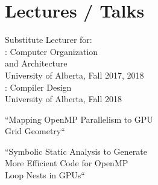 \documentclass[]{twocol-resume}
\begin{document}
\begin{minipage}[t]{0.33\textwidth}
\section{Lectures / Talks}
\vspace{\topsep} %
\begin{tightemize}
\item Substitute Lecturer for:
  \\\hspace{-3mm}: Computer Organization
  \\\hspace{-3mm}and Architecture
  \\\hspace{-3mm}University of Alberta, Fall 2017, 2018
  \\\hspace{-3mm}: Compiler Design
  \\\hspace{-3mm}University of Alberta, Fall 2018
\item ``Mapping OpenMP Parallelism to GPU
  \\\hspace{-3mm}Grid Geometry``
\item ``Symbolic Static Analysis to Generate\\\hspace{-3mm}More Efficient Code for
  OpenMP \\\hspace{-3mm}Loop Nests in GPUs`` \\\hspace{-3mm}
\end{tightemize}


\end{minipage}
\end{document}
